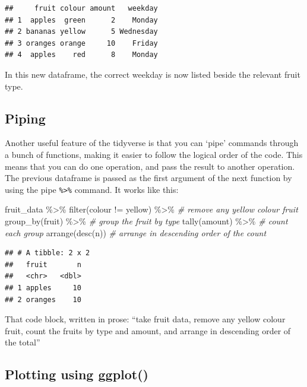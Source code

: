 \documentclass[
]{book}
\newenvironment{Shaded}{\begin{snugshade}}{\end{snugshade}}
\newcommand{\CommentTok}[1]{\textcolor[rgb]{0.56,0.35,0.01}{\textit{#1}}}
\newcommand{\FunctionTok}[1]{\textcolor[rgb]{0.00,0.00,0.00}{#1}}
\newcommand{\NormalTok}[1]{#1}
\newcommand{\SpecialCharTok}[1]{\textcolor[rgb]{0.00,0.00,0.00}{#1}}
\newcommand{\StringTok}[1]{\textcolor[rgb]{0.31,0.60,0.02}{#1}}
\begin{document}
\begin{verbatim}
##     fruit colour amount   weekday
## 1  apples  green      2    Monday
## 2 bananas yellow      5 Wednesday
## 3 oranges orange     10    Friday
## 4  apples    red      8    Monday
\end{verbatim}

In this new dataframe, the correct weekday is now listed beside the relevant fruit type.

\hypertarget{piping}{%
\subsection{Piping}\label{piping}}

Another useful feature of the tidyverse is that you can `pipe' commands through a bunch of functions, making it easier to follow the logical order of the code. This means that you can do one operation, and pass the result to another operation. The previous dataframe is passed as the first argument of the next function by using the pipe \texttt{\%\textgreater{}\%} command. It works like this:

\begin{Shaded}
\begin{Highlighting}[]
\NormalTok{fruit\_data }\SpecialCharTok{\%\textgreater{}\%} 
  \FunctionTok{filter}\NormalTok{(colour }\SpecialCharTok{!=} \StringTok{\textquotesingle{}yellow\textquotesingle{}}\NormalTok{) }\SpecialCharTok{\%\textgreater{}\%} \CommentTok{\# remove any yellow colour fruit}
  \FunctionTok{group\_by}\NormalTok{(fruit) }\SpecialCharTok{\%\textgreater{}\%} \CommentTok{\# group the fruit by type}
  \FunctionTok{tally}\NormalTok{(amount) }\SpecialCharTok{\%\textgreater{}\%} \CommentTok{\# count each group}
  \FunctionTok{arrange}\NormalTok{(}\FunctionTok{desc}\NormalTok{(n)) }\CommentTok{\# arrange in descending order of the count}
\end{Highlighting}
\end{Shaded}

\begin{verbatim}
## # A tibble: 2 x 2
##   fruit       n
##   <chr>   <dbl>
## 1 apples     10
## 2 oranges    10
\end{verbatim}

That code block, written in prose: ``take fruit data, remove any yellow colour fruit, count the fruits by type and amount, and arrange in descending order of the total''

\hypertarget{plotting-using-ggplot}{%
\subsection{Plotting using ggplot()}\label{plotting-using-ggplot}}
\end{document}

